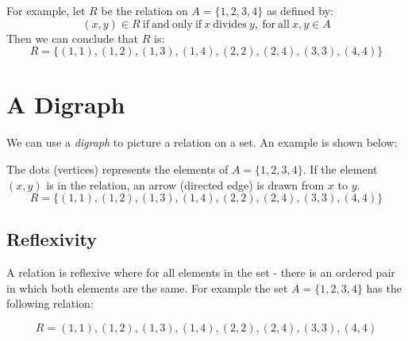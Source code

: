 For example, let $R$ be the relation on $A = \{1, 2, 3, 4\}$ as defined by:
\[(x, y) \in R \mathrm{\ if\ and\ only\ if\ } x \mathrm{\ divides\ } y\mathrm{,\ for\ all\ } x, y \in A \]
Then we can conclude that $R$ is:
\[R = \{(1,1), (1,2), (1,3), (1,4), (2,2), (2,4), (3,3), (4,4)\}\]

\section{A Digraph}
We can use a \textit{digraph} to picture a relation on a set. An example is shown below:
\begin{figure}[H]
    \centering
\end{figure}

The dots (vertices) represents the elements of $A = \{1,2,3,4\}$. If the element $(x, y)$ is in the relation, an arrow (directed edge) is drawn from $x$ to $y$. 
\[R = \{(1,1), (1,2), (1,3), (1,4), (2,2), (2,4), (3,3), (4,4)\}\]

\subsection{Reflexivity}
A relation is reflexive where for all elements in the set - there is an ordered pair in which both elements are the same. For example the set $A = \{1, 2, 3, 4\}$ has the following relation:

\[R = {(1,1), (1,2), (1,3), (1,4), (2,2), (2,4), (3,3), (4,4)}\]


